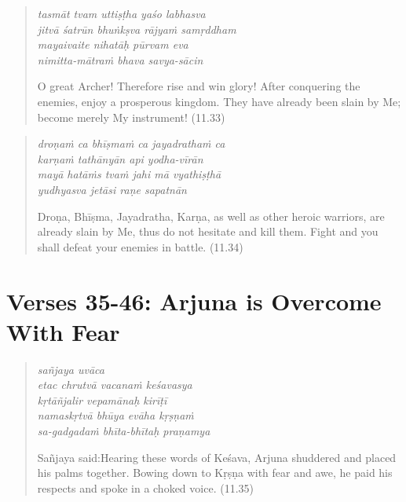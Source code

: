 \documentclass[12pt, twoside, openright]{memoir}
\begin{document}
\par
\begin{verse}
\textit{tasmāt tvam uttiṣṭha yaśo labhasva} \\
\textit{jitvā śatrūn bhuṅkṣva rājyaṁ samṛddham} \\
\textit{mayaivaite nihatāḥ pūrvam eva} \\
\textit{nimitta-mātraṁ bhava savya-sācin}

\noindent O great Archer! Therefore rise and win glory! After conquering the enemies, enjoy a prosperous kingdom. They have already been slain by Me; become merely My instrument! (11.33)
\end{verse}
\par



\par
\begin{verse}
\textit{droṇaṁ ca bhīṣmaṁ ca jayadrathaṁ ca} \\
\textit{karṇaṁ tathānyān api yodha-vīrān} \\
\textit{mayā hatāṁs tvaṁ jahi mā vyathiṣṭhā} \\
\textit{yudhyasva jetāsi raṇe sapatnān}

\noindent Droṇa, Bhīṣma, Jayadratha, Karṇa, as well as other heroic warriors, are already slain by Me, thus do not hesitate and kill them. Fight and you shall defeat your enemies in battle. (11.34)
\end{verse}
\par


\newpage
\section{Verses 35-46: Arjuna is Overcome With Fear}\label{sec-verses-35-46-arjuna-is-overcome-with-fear}


\par
\begin{verse}
\textit{sañjaya uvāca} \\
\textit{etac chrutvā vacanaṁ keśavasya} \\
\textit{kṛtāñjalir vepamānaḥ kirīṭī} \\
\textit{namaskṛtvā bhūya evāha kṛṣṇaṁ} \\
\textit{sa-gadgadaṁ bhīta-bhītaḥ praṇamya}

\noindent \quad Sañjaya said:\linebreak Hearing these words of Keśava, Arjuna shuddered and placed his palms together. Bowing down to Kṛṣṇa with fear and awe, he paid his respects and spoke in a choked voice. (11.35)
\end{verse}
\par
\end{document}
